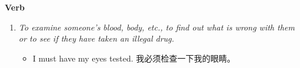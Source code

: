 \noindent\textbf{Verb}

\begin{enumerate}[leftmargin=*, topsep=0pt]
\setcounter{enumi}{0} %
\item \textit{To examine someone’s blood, body, etc., to find out what is wrong with them or to see if they have taken an illegal drug.}
\textcolor{examplecolor}{
\begin{itemize}[leftmargin=*, topsep=0pt]
\item I must have my eyes tested. 我必须检查一下我的眼睛。
\end{itemize}
}
\end{enumerate}